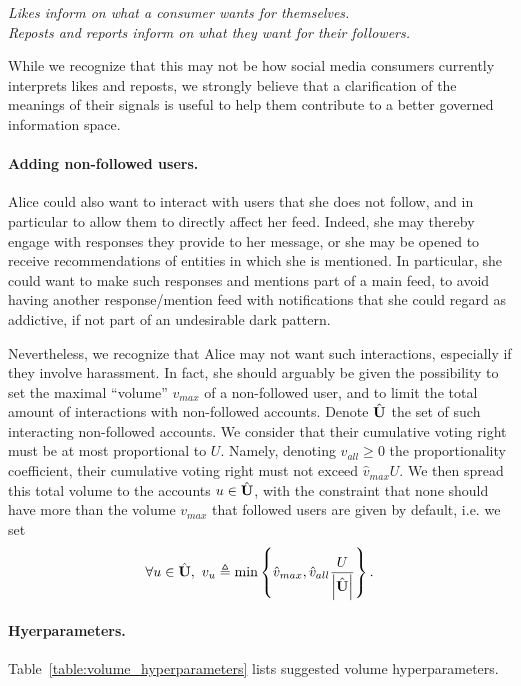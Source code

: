 \begin{center}
    \emph{Likes inform on what a consumer wants for themselves. \\
    Reposts and reports inform on what they want for their followers.}
\end{center}

While we recognize that this may not be 
how social media consumers currently interprets likes and reposts,
we strongly believe that a clarification of the meanings of their signals
is useful to help them contribute to a better governed information space.

\paragraph{Adding non-followed users.}
Alice could also want to interact with users that she does not follow,
and in particular to allow them to directly affect her feed.
Indeed, she may thereby engage with responses they provide to her message,
or she may be opened to receive recommendations of entities in which she is mentioned.
In particular, she could want to make such responses and mentions part of a main feed,
to avoid having another response/mention feed with notifications
that she could regard as addictive, if not part of an undesirable dark pattern.

Nevertheless, we recognize that Alice may not want such interactions,
especially if they involve harassment.
In fact, she should arguably be given the possibility to set the maximal ``volume''
$v_{max}$ of a non-followed user,
and to limit the total amount of interactions with non-followed accounts.
Denote $\hat {{\bf U}}$ the set of such interacting non-followed accounts.
We consider that their cumulative voting right must be at most proportional to $U$.
Namely, denoting $\hat v_{all} \geq 0$ the proportionality coefficient,
their cumulative voting right must not exceed $\hat v_{max} U$.
We then spread this total volume to the accounts $u \in \hat {{\bf U}}$,
with the constraint that none should have more than the volume $v_{max}$
that followed users are given by default, i.e. we set
\begin{align}
    \forall u \in \hat {{\bf U}} ,~
    v_u \triangleq \min \left\lbrace \hat v_{max}, \hat v_{all} \frac{U}{\left\lvert{\hat {{\bf U}}}\right\rvert} \right\rbrace.
\end{align}

\paragraph{Hyerparameters.}
Table~\ref{table:volume_hyperparameters} lists suggested volume hyperparameters.

